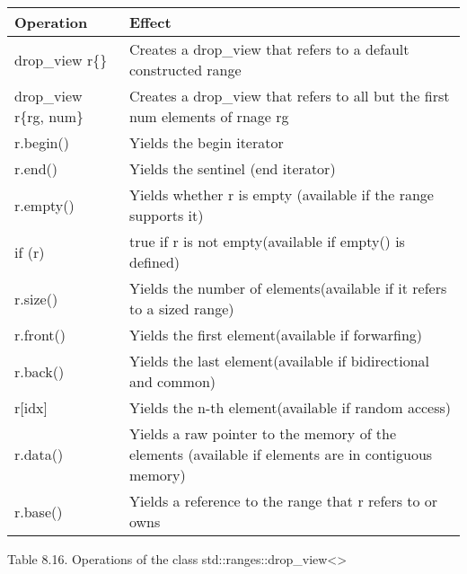 \begin{longtable}[c]{|l|l|}
\hline
\textbf{Operation} & \textbf{Effect}                                                        \\ \hline
\endfirsthead
%
\endhead
%
drop\_view r\{\}   & Creates a drop\_view that refers to a default constructed range        \\ \hline
drop\_view r\{rg, num\} & Creates a drop\_view that refers to all but the first num elements of rnage rg                      \\ \hline
r.begin()          & Yields the begin iterator                                              \\ \hline
r.end()            & Yields the sentinel (end iterator)                                     \\ \hline
r.empty()          & Yields whether r is empty (available if the range supports it)         \\ \hline
if (r)             & true if r is not empty(available if empty() is defined)                \\ \hline
r.size()           & Yields the number of elements(available if it refers to a sized range) \\ \hline
r.front()          & Yields the first element(available if forwarfing)                      \\ \hline
r.back()           & Yields the last element(available if bidirectional and common)         \\ \hline
r{[}idx{]}         & Yields the n-th element(available if random access)                    \\ \hline
r.data()                & Yields a raw pointer to the memory of the elements (available if elements are in contiguous memory) \\ \hline
r.base()           & Yields a reference to the range that r refers to or owns               \\ \hline
\end{longtable}

\begin{center}
Table 8.16. Operations of the class std::ranges::drop\_view<>
\end{center}







